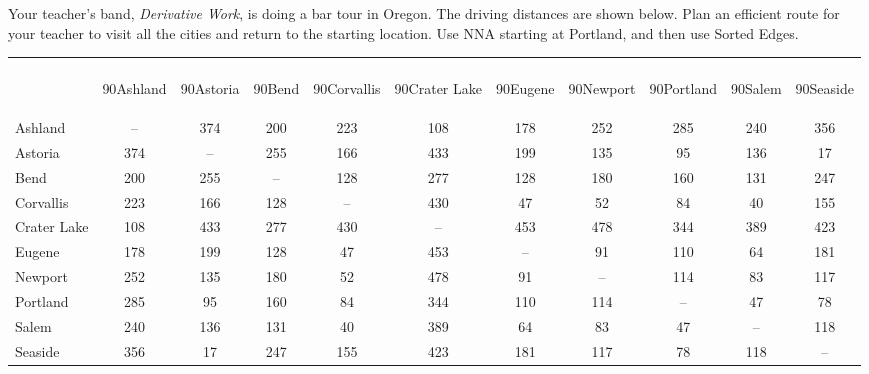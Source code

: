 \begin{example}{} %
Your teacher's band, \textit{Derivative Work}, is doing a bar tour in Oregon.  The driving distances are shown below.  Plan an efficient route for your teacher to visit all the cities and return to the starting location.  Use NNA starting at Portland, and then use Sorted Edges.
\begin{center}
\begin{tabular}{|l|c|c|c|c|c|c|c|c|c|c|}
\hline
&&&&&&&&&&\\[7ex]
& \begin{rotate}{90}Ashland \end{rotate}& \begin{rotate}{90}Astoria\end{rotate}  & \begin{rotate}{90}Bend \end{rotate}& \begin{rotate}{90}Corvallis \end{rotate} & \begin{rotate}{90}Crater Lake \end{rotate} &  \begin{rotate}{90}Eugene  \end{rotate}&  \begin{rotate}{90}Newport \end{rotate} &  \begin{rotate}{90}Portland  \end{rotate}& \begin{rotate}{90}Salem \end{rotate} &  \begin{rotate}{90}Seaside \end{rotate}\\
\hline
Ashland & --&374&200&223&108&178&252&285&240&356\\
\hline
Astoria & 374&--&255&166&433&199&135&95&136&17\\
\hline
Bend & 200 & 255 &--&128&277&128&180 & 160&131&247\\
\hline
Corvallis&223&166&128&--&430&47&52&84&40&155\\
\hline
Crater Lake &108&433&277&430&--&453&478&344&389&423\\
\hline
Eugene &178&199&128&47&453&--&91&110&64&181\\
\hline
Newport&252&135&180&52&478&91&--&114&83&117\\
\hline
Portland &285&95&160&84&344&110&114&--&47&78\\
\hline
Salem & 240 &136&131&40&389&64&83&47&--&118\\
\hline
Seaside&356&17&247&155&423&181&117&78&118&--\\
\hline
\end{tabular}
\end{center}


\end{example}
